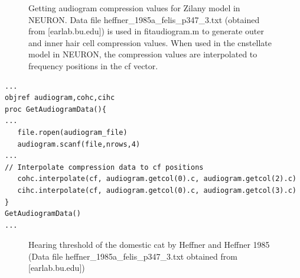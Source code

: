 \begin{figure}[htb]
\begin{center}
\caption{Getting audiogram compression values for Zilany model in NEURON. Data file \mbox{heffner\_1985a\_felis\_p347\_3.txt} (obtained from [earlab.bu.edu]) is used in \textsf{fitaudiogram.m} to generate outer and inner hair cell compression values. When used in the \textsf{cnstellate} model in NEURON, the compression values are interpolated to frequency positions in the \textsf{cf} vector.}\label{fig:GetAudiogram}
\end{center}
\end{figure}

\begin{lstlisting}[label=lst:getaudiogramdata,caption= Procedure to get
  audiogram data and interpolate to freuencies in \textsf{cf} vector (
  \mbox{\textsf{Utilities.hoc}})]
...
objref audiogram,cohc,cihc
proc GetAudiogramData(){
...
   file.ropen(audiogram_file)
   audiogram.scanf(file,nrows,4)
...
// Interpolate compression data to cf positions 
   cohc.interpolate(cf, audiogram.getcol(0).c, audiogram.getcol(2).c)
   cihc.interpolate(cf, audiogram.getcol(0).c, audiogram.getcol(3).c)
}
GetAudiogramData() 
...
\end{lstlisting}

\medskip{}

\begin{figure}[htb]
\begin{center}
\caption{Hearing threshold of the domestic cat by Heffner and Heffner
  1985 \citep{HeffnerHeffner:1985} (Data file
  \mbox{\textsf{heffner\_1985a\_felis\_p347\_3.txt}} obtained from [earlab.bu.edu])}
\label{fig:AudThresholdRat}
\end{center}
\end{figure}


